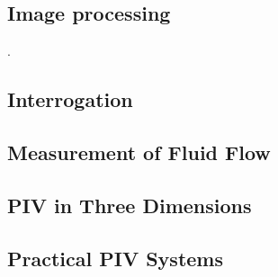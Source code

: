 \subsection{Image processing}

\cite{soloff1997, willert1997}.

\subsection{Interrogation}

\subsection{Measurement of Fluid Flow}

\subsection{PIV in Three Dimensions}

\subsection{Practical PIV Systems}


